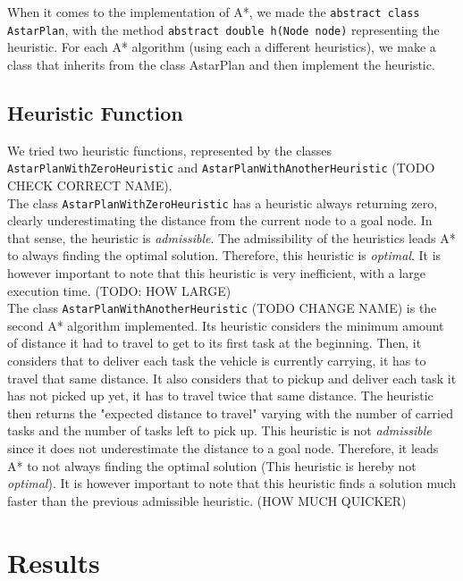 \documentclass[11pt]{article}
\begin{document}
When it comes to the implementation of A*, we made the \texttt{abstract class AstarPlan}, with the method \texttt{abstract double h(Node node)} representing the heuristic. For each A* algorithm (using each a different heuristics), we make a class that inherits from\textsl{} the class AstarPlan and then implement the heuristic. 

\subsection{Heuristic Function}
We tried two heuristic functions, represented by the classes \texttt{AstarPlanWithZeroHeuristic} and \texttt{AstarPlanWithAnotherHeuristic} (TODO CHECK CORRECT NAME).\\

The class \texttt{AstarPlanWithZeroHeuristic} has a heuristic always returning zero, clearly underestimating the distance from the current node to a goal node. In that sense, the heuristic is \textit{admissible}. The admissibility of the heuristics leads A* to always finding the optimal solution. Therefore, this heuristic is \textit{optimal}. It is however important to note that this heuristic is very inefficient, with a large execution time. (TODO: HOW LARGE)\\

The class \texttt{AstarPlanWithAnotherHeuristic} (TODO CHANGE NAME) is the second A* algorithm implemented. Its heuristic considers the minimum amount of distance it had to travel to get to its first task at the beginning. Then, it considers that to deliver each task the vehicle is currently carrying, it has to travel that same distance. It also considers that to pickup and deliver each task it has not picked up yet, it has to travel twice that same distance. The heuristic then returns the "expected distance to travel" varying with the number of carried tasks and the number of tasks left to pick up. This heuristic is not \textit{admissible} since it does not underestimate the distance to a goal node. Therefore, it leads A* to not always finding the optimal solution (This heuristic is hereby not \textit{optimal}). It is however important to note that this heuristic finds a solution much faster than the previous admissible heuristic. (HOW MUCH QUICKER) 

\section{Results}
\end{document}
